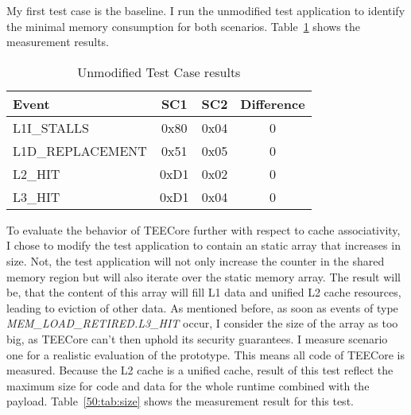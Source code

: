 My first test case is the baseline. I run the unmodified test application to
identify the minimal memory consumption for both scenarios.
Table~\ref{50:tab:ping_base} shows the measurement results. 

\begin{table}[ht]
    \centering
    \begin{tabular}{ |l||c|c|c| }
        \hline
        Event            & SC1  & SC2  & Difference \\
        \hline
        L1I\_STALLS      & 0x80 & 0x04 & 0          \\
        L1D\_REPLACEMENT & 0x51 & 0x05 & 0          \\
        L2\_HIT          & 0xD1 & 0x02 & 0          \\
        L3\_HIT          & 0xD1 & 0x04 & 0          \\
        \hline
    \end{tabular}
    \caption{Unmodified Test Case results}
    \label{50:tab:ping_base}
\end{table}


To evaluate the behavior of TEECore further with respect to cache associativity,
I chose to modify the test application to contain an static array that increases
in size. Not, the test application will not only increase the counter in the
shared memory region but will also iterate over the static memory array. The
result will be, that the content of this array will fill L1 data and unified L2
cache resources, leading to eviction of other data. As mentioned before, as soon
as events of type \textit{MEM\_LOAD\_RETIRED.L3\_HIT} occur, I consider the size
of the array as too big, as TEECore can't then uphold its security guarantees. I
measure scenario one for a realistic evaluation of the prototype. This means all
code of TEECore is measured. Because the L2 cache is a unified cache, result of
this test reflect the maximum size for code and data for the whole runtime
combined with the payload. Table~\ref{50:tab:size} shows the measurement result
for this test.

